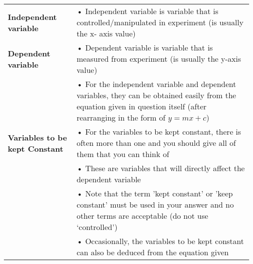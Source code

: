 \documentclass{article}
\begin{document}
    \begin{longtable}{|p{5cm}|p{11.5cm}|}
  

    \hline
           \textbf{Independent variable} &  • Independent variable is variable that is controlled/manipulated in experiment  (is usually the x- axis value) \\ 
        
    \cline{1-1}
       \textbf{Dependent variable} &    •	Dependent variable is variable that is measured from experiment (is usually the y-axis value)\\
    &•	For the independent variable and dependent variables,
they can be obtained easily from the equation given in question itself (after rearranging in the form of $y=mx+c$)\\

    \hline 
   \textbf{Variables to be kept Constant}& •	For the variables to be kept constant, there is often more than one and you should give all of them that you can think of\\
    &•	These are variables that will directly affect the dependent variable\\
    &•	Note that the term 'kept constant' or 'keep constant' must be used in your answer and no other terms are acceptable (do not use ‘controlled’)\\
    &•	Occasionally, the variables to be kept constant can also be
    deduced from the equation given\\
    

\end{longtable}
\end{document}
